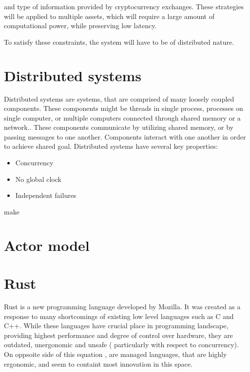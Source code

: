 and type of information provided by cryptocurrency exchanges. These strategies will be
applied to multiple assets, which will require a large amount of computational power, while preserving low latency.

To satisfy these constraints, the system will have to be of distributed nature.


\section{Distributed systems}
Distributed systems are systems, that are comprised of many loosely coupled components. These components might be threads
in single process, processes on single computer, or multiple computers connected through shared memory or a network..
These components communicate by utilizing shared memory, or by passing messages to one another. Components interact with
one another in order to achieve shared goal. Distributed systems have several key properties:

\begin{itemize}
    \item Concurrency
    \item No global clock
    \item Independent failures
\end{itemize}
make

\section{Actor model}
\section{Rust}
Rust is a new programming language developed by Mozilla. It was created as a response to many shortcomings of existing low level
languages such as C and C++. While these languages have crucial place in programming landscape, providing highest performance and
degree of control over hardware, they are outdated, unergonomic and unsafe ( particularly with respect to concurrency). On oppsoite
side of this equation , are managed languages, that are highly ergonomic, and seem to containt most innovation in this space.

